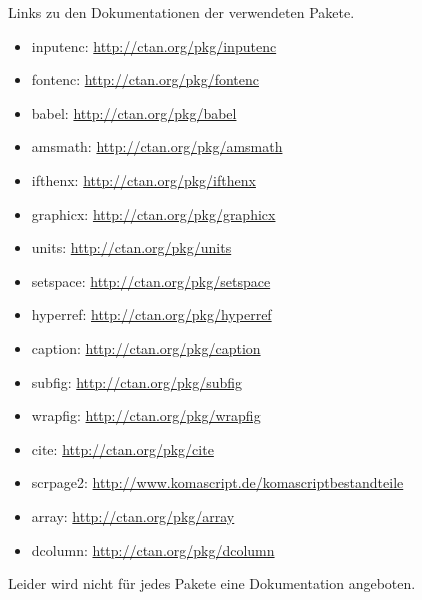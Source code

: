 \label{anhang}

Links zu den Dokumentationen der verwendeten Pakete.

\begin{itemize}
    \item inputenc: \url{http://ctan.org/pkg/inputenc}
    \item fontenc: \url{http://ctan.org/pkg/fontenc}
    \item babel: \url{http://ctan.org/pkg/babel}
    \item amsmath: \url{http://ctan.org/pkg/amsmath}
    \item ifthenx: \url{http://ctan.org/pkg/ifthenx}
    \item graphicx: \url{http://ctan.org/pkg/graphicx}
    \item units: \url{http://ctan.org/pkg/units}
    \item setspace: \url{http://ctan.org/pkg/setspace}
    \item hyperref: \url{http://ctan.org/pkg/hyperref}
    \item caption: \url{http://ctan.org/pkg/caption}
    \item subfig: \url{http://ctan.org/pkg/subfig}
    \item wrapfig: \url{http://ctan.org/pkg/wrapfig}
    \item cite: \url{http://ctan.org/pkg/cite}
    \item scrpage2: \url{http://www.komascript.de/komascriptbestandteile}
    \item array: \url{http://ctan.org/pkg/array}
    \item dcolumn: \url{http://ctan.org/pkg/dcolumn}
\end{itemize}

Leider wird nicht für jedes Pakete eine Dokumentation angeboten.
